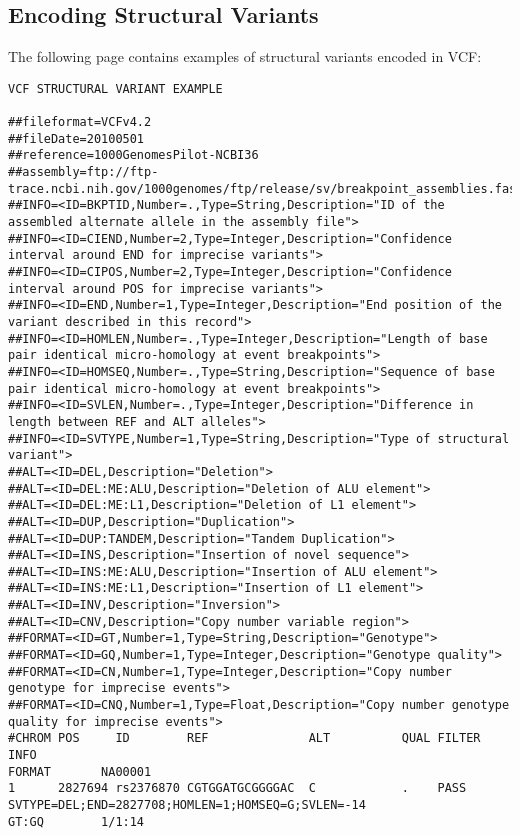 \documentclass[8pt]{article}
\begin{document}
\subsection{Encoding Structural Variants}
The following page contains examples of structural variants encoded in VCF:
\pagebreak
\footnotesize
\begin{landscape}
\begin{verbatim}
VCF STRUCTURAL VARIANT EXAMPLE

##fileformat=VCFv4.2
##fileDate=20100501
##reference=1000GenomesPilot-NCBI36
##assembly=ftp://ftp-trace.ncbi.nih.gov/1000genomes/ftp/release/sv/breakpoint_assemblies.fasta
##INFO=<ID=BKPTID,Number=.,Type=String,Description="ID of the assembled alternate allele in the assembly file">
##INFO=<ID=CIEND,Number=2,Type=Integer,Description="Confidence interval around END for imprecise variants">
##INFO=<ID=CIPOS,Number=2,Type=Integer,Description="Confidence interval around POS for imprecise variants">
##INFO=<ID=END,Number=1,Type=Integer,Description="End position of the variant described in this record">
##INFO=<ID=HOMLEN,Number=.,Type=Integer,Description="Length of base pair identical micro-homology at event breakpoints">
##INFO=<ID=HOMSEQ,Number=.,Type=String,Description="Sequence of base pair identical micro-homology at event breakpoints">
##INFO=<ID=SVLEN,Number=.,Type=Integer,Description="Difference in length between REF and ALT alleles">
##INFO=<ID=SVTYPE,Number=1,Type=String,Description="Type of structural variant">
##ALT=<ID=DEL,Description="Deletion">
##ALT=<ID=DEL:ME:ALU,Description="Deletion of ALU element">
##ALT=<ID=DEL:ME:L1,Description="Deletion of L1 element">
##ALT=<ID=DUP,Description="Duplication">
##ALT=<ID=DUP:TANDEM,Description="Tandem Duplication">
##ALT=<ID=INS,Description="Insertion of novel sequence">
##ALT=<ID=INS:ME:ALU,Description="Insertion of ALU element">
##ALT=<ID=INS:ME:L1,Description="Insertion of L1 element">
##ALT=<ID=INV,Description="Inversion">
##ALT=<ID=CNV,Description="Copy number variable region">
##FORMAT=<ID=GT,Number=1,Type=String,Description="Genotype">
##FORMAT=<ID=GQ,Number=1,Type=Integer,Description="Genotype quality">
##FORMAT=<ID=CN,Number=1,Type=Integer,Description="Copy number genotype for imprecise events">
##FORMAT=<ID=CNQ,Number=1,Type=Float,Description="Copy number genotype quality for imprecise events">
#CHROM POS     ID        REF              ALT          QUAL FILTER INFO                                                               FORMAT       NA00001
1      2827694 rs2376870 CGTGGATGCGGGGAC  C            .    PASS   SVTYPE=DEL;END=2827708;HOMLEN=1;HOMSEQ=G;SVLEN=-14                 GT:GQ        1/1:14

\end{verbatim}
\end{landscape}
\end{document}
